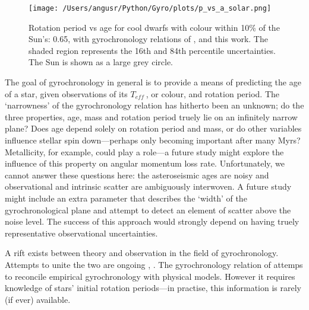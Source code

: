 \documentclass[10pt,preprint]{aastex}
\newcommand{\teff}{$T_{eff}~$}
\begin{document}
\begin{figure}[ht]
\begin{center}
\texttt{[image: /Users/angusr/Python/Gyro/plots/p\_vs\_a\_solar.png]}
\caption{Rotation period vs age for cool dwarfs with colour within 10\% of the Sun's: 0.65, with gyrochronology relations of \citet{Barnes2007}, \citet{Mamajek2008} and this work. The shaded region represents the 16th and 84th percentile uncertainties. The Sun is shown as a large grey circle.}
\label{fig:p_vs_a_solar}
\end{center}
\end{figure}


The goal of gyrochronology in general is to provide a means of predicting the age of a star, given observations of its \teff, or colour, and rotation period.
The `narrowness' of the gyrochronology relation has hitherto been an unknown; do the three properties, age, mass and rotation period truely lie on an infinitely narrow plane?
Does age depend solely on rotation period and mass, or do other variables influence stellar spin down---perhaps only becoming important after many Myrs?
Metallicity, for example, could play a role---a future study might explore the influence of this property on angular momentum loss rate.
Unfortunately, we cannot answer these questions here: the asteroseismic ages are noisy and observational and intrinsic scatter are ambiguously interwoven.
A future study might include an extra parameter that describes the `width' of the gyrochronological plane and attempt to detect an element of scatter above the noise level.
The success of this approach would strongly depend on having truely representative observational uncertainties.

A rift exists between theory and observation in the field of gyrochronology.
Attempts to unite the two are ongoing \citep{Barnes2011}, \citep{vanSaders2013}.
The gyrochronology relation of \citet{Barnes2010} attemps to reconcile empirical gyrochronology with physical models.
However it requires knowledge of stars' initial rotation periods---in practise, this information is rarely (if ever) available.
\end{document}
